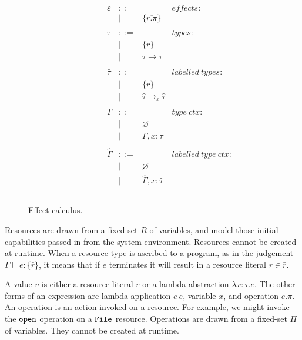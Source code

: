 \begin{figure}[h]
\[\begin{array}{lll}
\begin{array}{lllr}
\end{array}

& ~~~~~~~~&

\begin{array}{lllr}

\varepsilon & ::= & ~ & effects: \\
	& | & \{ \overline{r.\pi} \} \\
	&&\\

\tau & ::= & ~ & types: \\
		& | & \{ \bar r \} \\
		& | & \tau \rightarrow \tau \\ 
		&&\\

\hat \tau & ::= & ~ & labelled ~types: \\
		& | & \{ \bar r \} \\
		& | & \hat \tau \rightarrow_{\varepsilon} \hat \tau \\
		&&\\

\Gamma & ::= & ~ & type~ctx: \\
				& | & \varnothing \\
				& | & \Gamma, x: \tau \\
				&&\\
				
\hat \Gamma & ::= & ~ & labelled~type~ctx:\\
				& | & \varnothing \\
				& | & \hat \Gamma, x: \hat \tau \\
				&&\\

\end{array}

\end{array}
\]

\vspace{-7pt}
\caption{Effect calculus.}
\label{This is the label.}
\end{figure}

Resources are drawn from a fixed set $R$ of variables, and model those initial capabilities passed in from the system environment. Resources cannot be created at runtime. When a resource type is ascribed to a program, as in the judgement $\Gamma \vdash e: \{ \bar r \}$, it means that if $e$ terminates it will result in a resource literal $r \in \bar r$.

A value $v$ is either a resource literal $r$ or a lambda abstraction $\lambda x: \tau.e$. The other forms of an expression are lambda application $e~e$, variable $x$, and operation $e.\pi$. An operation is an action invoked on a resource. For example, we might invoke the $\mathtt{open}$ operation on a $\mathtt{File}$ resource. Operations are drawn from a fixed-set $\Pi$ of variables. They cannot be created at runtime.

